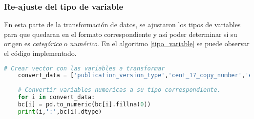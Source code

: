 \subsubsection{Re-ajuste del tipo de variable }
En esta parte de la transformación de datos, se ajustaron los tipos de variables para que quedaran en el formato correspondiente y así poder determinar si su origen es \textit{categórico} o \textit{numérico}. En el algoritmo \ref{tipo_variable} se puede observar el código implementado. 

\begin{lstlisting}[basicstyle=\scriptsize,language=Python, label=tipo_variable, caption=Re-ajustar tipo de variables en Python.]
	# Crear vector con las variables a transformar
	convert_data = ['publication_version_type','cent_17_copy_number','er_positivity_scale_used','her_2_copy_number','her_2_ihc_score','ihc_score','positive_lymph_keratin','pr_positivity_ihc_intensity_score','pr_positivity_scale_used','fraction_genome_altered','number_samples','tmb_nonsynonymous','her_2_cent_17_ratio','lymph_examined_number','mutation_count','overall_survival_months','disease_free_months','days_last_followup']
	
	# Convertir variables numericas a su tipo correspondiente.
	for i in convert_data:
	bc[i] = pd.to_numeric(bc[i].fillna(0))
	print(i,':',bc[i].dtype)
\end{lstlisting}



